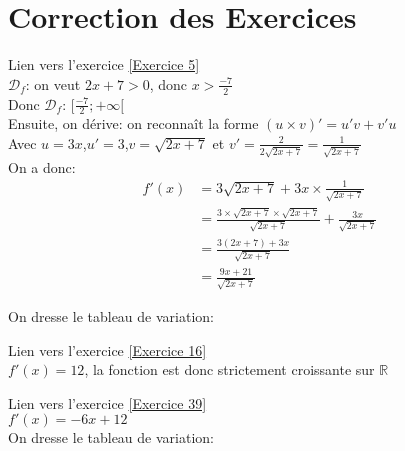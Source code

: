 \documentclass[12pt,fleqn]{report} %
\begin{document}
\chapter{Correction des Exercices}
\begin{correction}Lien vers l'exercice   \ref{Exercice 5}\\
	$\mathcal{D}_f$: on veut $2x+7>0$, donc $x>\frac{-7}{2}$\\
	Donc $\mathcal{D}_f$: $[\frac{-7}{2};+\infty[$\\
	Ensuite, on dérive: on reconnaît la forme $(u\times v)' =u'v+v'u$ \\
	Avec $u= 3x$,\quad $u'=3$,\quad $v= \sqrt{2x+7}$ et $v'=\frac{2}{2\sqrt{2x+7}}= \frac{1}{\sqrt{2x+7}}$\\
	On a donc: \\
	\begin{align*}
	f'(x) & = 3\sqrt{2x+7}+ 3x\times  \frac{1}{\sqrt{2x+7}}\\
	& = \frac{3\times \sqrt{2x+7} \times \sqrt{2x+7}}{\sqrt{2x+7}}+ \frac{3x}{\sqrt{2x+7}}\\
	& = \frac{3(2x+7)+3x}{\sqrt{2x+7}}\\
	& = \frac{9x+21}{\sqrt{2x+7}}
	\end{align*}
	
	
	On dresse le tableau de variation:\\
	\begin{center}
	\end{center}
\end{correction}

\begin{correction}Lien vers l'exercice   \ref{Exercice 16}\text{ }\\
	$f'(x)= 12$, la fonction est donc strictement croissante sur $\mathbb{R}$
\end{correction}



\begin{correction}Lien vers l'exercice   \ref{Exercice 39}\\
	$f'(x)= -6x+12$ \\[2mm]
	On dresse le tableau de variation:
	
	\begin{center}
	\end{center}
\end{correction}
\end{document}
